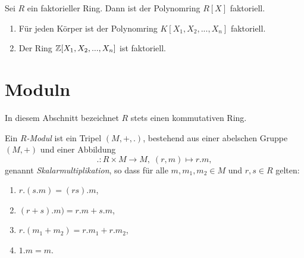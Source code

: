 \documentclass{book}
\begin{document}
\begin{thm}
    \label{thm:fakt}
    Sei $R$ ein faktorieller Ring. Dann ist der Polynomring $R[X]$ faktoriell. 
\end{thm}

\begin{exas}
    \label{exas:faktoriell}
    \begin{enumerate}
        \item Für jeden Körper ist der Polynomring $K[X_1,X_2,...,X_n]$ faktoriell.
        \item Der Ring $\mathbb{Z}[X_1,X_2,...,X_n]$ ist faktoriell. 
    \end{enumerate}
\end{exas}

\section{Moduln}%
\label{sec:moduln}

In diesem Abschnitt bezeichnet $R$ stets einen kommutativen Ring. 

\begin{defi}
    \label{defi:modul}
    Ein \emph{$R$-Modul} ist ein Tripel $(M,+,.)$, bestehend
    aus einer abelschen Gruppe $(M,+)$ und einer Abbildung
    \[
        .: R \times M \to M, \; (r,m) \mapsto r.m,
    \]
    genannt {\em Skalarmultiplikation}, so dass für alle $m,m_1,m_2 \in M$ und
    $r,s \in R$ gelten:
    \begin{enumerate}[label=(M\arabic*)]
        \item $r.(s.m) = (rs).m$,
        \item $(r+s).m) = r.m + s.m$,
        \item $r.(m_1 + m_2) = r.m_1 + r. m_2$,
        \item $1.m = m$. 
    \end{enumerate}
\end{defi}
\end{document}
